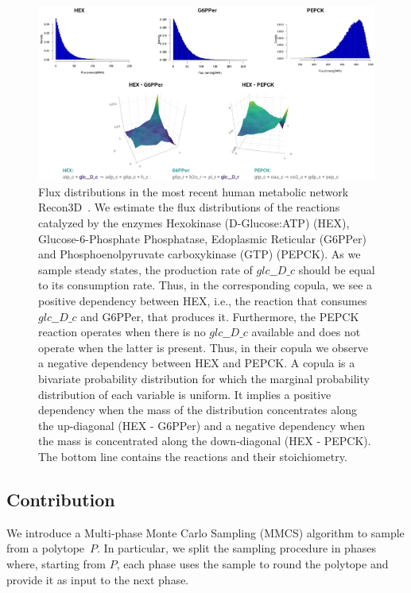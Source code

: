    \begin{figure}[h]
      \centering
      \includegraphics[width=125mm]{figures/copulas_cropped.png}
      \caption{
         Flux distributions in the most recent human metabolic network Recon3D~\cite{brunk2018recon3d}. 
         We estimate the flux distributions of the reactions catalyzed by the enzymes Hexokinase (D-Glucose:ATP) (HEX), Glucose-6-Phosphate Phosphatase, Edoplasmic Reticular (G6PPer)
         and Phosphoenolpyruvate carboxykinase (GTP) (PEPCK).
         As we sample steady states, the production rate of $glc\_\_D \_c$ should be equal to its consumption rate. 
         Thus, in the corresponding copula, we see a positive dependency between HEX,
         i.e., the reaction that consumes $glc\_\_D \_c$ and G6PPer, that produces it.
         Furthermore, the PEPCK reaction operates when there is no $glc\_\_D\_c$ available and does not operate when the latter is present.
         Thus, in their copula we observe a negative dependency between HEX and PEPCK.
         A copula is a bivariate probability distribution for which the marginal probability distribution of each variable is uniform.
         It implies a positive dependency when the mass of the distribution concentrates along the up-diagonal (HEX - G6PPer)
         and a negative dependency when the mass is concentrated along the down-diagonal (HEX - PEPCK). %
         The bottom line contains the  reactions and their stoichiometry.
      }
   \end{figure}


\subsection{Contribution}

   We introduce a Multi-phase Monte Carlo Sampling (MMCS) algorithm
   to sample from a polytope~$P$. 
   In particular, we split the sampling procedure in phases where, starting from $P$,
   each phase uses the sample to round the polytope and provide it as input to the next phase.
   
